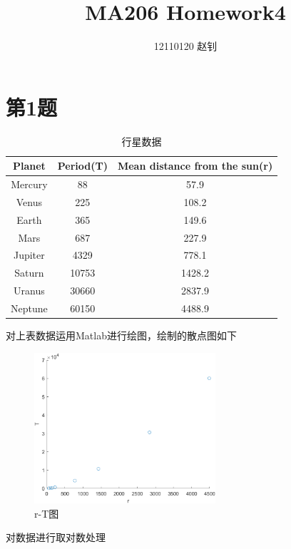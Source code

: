 \documentclass{article}
\title{MA206 Homework4}
\author{12110120 赵钊}
\begin{document}
\maketitle


\section{第1题}

\begin{table}[!h]
\begin{center}
\begin{tabular}{ c c c }
    \hline
    Planet & Period(T) & Mean distance from the sun(r)\\
    \hline
    Mercury & 88 & 57.9\\
    Venus & 225 & 108.2\\ 
    Earth & 365 & 149.6\\ 
    Mars & 687 & 227.9\\ 
    Jupiter & 4329 & 778.1\\
    Saturn & 10753 & 1428.2\\
    Uranus & 30660 & 2837.9\\
    Neptune & 60150 & 4488.9\\
    \hline
\end{tabular}
\caption{\label{demo-table}行星数据}
\end{center}
\end{table}

对上表数据运用Matlab进行绘图，绘制的散点图如下

\begin{figure}[!h]
    \centering
    \includegraphics[width=0.6\textwidth]{picture/hw4_1.png}
    \caption{r-T图}
\end{figure}

\newpage

对数据进行取对数处理
\end{document}
